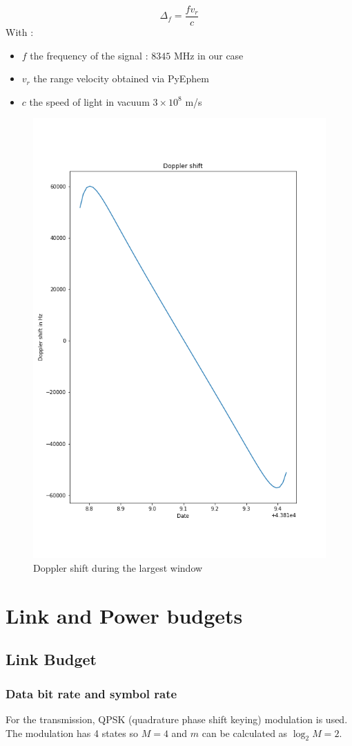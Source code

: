 \documentclass[a4paper,12pt,calibri,oneside,openany]{book}
\theoremstyle{break}
\begin{document}
$$
\Delta_f = \frac{fv_r}{c}
$$
With :
\begin{itemize}
	\item $f$ the frequency of the signal : $8345$ MHz in our case
	\item $v_r$ the range velocity obtained via PyEphem
	\item $c$ the speed of light in vacuum $3\times10^8$ m/s
\end{itemize}
\begin{figure}[H]
	\centering
	\includegraphics[width=0.6\linewidth]{windowdoppler}
	\caption{Doppler shift during the largest window}
\end{figure}

\chapter{Link and Power budgets}
\section{Link Budget}

	\subsection{Data bit rate and symbol rate}
	
		For the transmission, QPSK (quadrature phase shift keying) modulation is used. The modulation has 4 states so $M=4$ and $m$ can be calculated as $\log_2 M = 2$.
		
\end{document}
